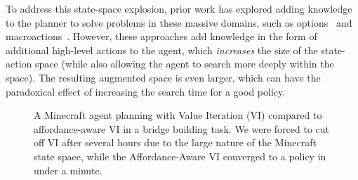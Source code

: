 \documentclass[]{article}
\begin{document}
To address this state-space explosion, prior work has explored adding
knowledge to the planner to solve problems in these
massive domains, such as options~\citep{sutton99} and
macroactions~\citep{Botea:2005kx,Newton:2005vn}. However, these
approaches add knowledge in the form of additional high-level actions
to the agent, which {\em increases} the size of the state-action space
(while also allowing the agent to search more deeply within the
space).  The resulting augmented space is even larger, which can have
the paradoxical effect of increasing the search time for a good
policy.

\begin{figure}
\centering
%
%
  \caption{A Minecraft agent planning with Value
    Iteration (VI) compared to affordance-aware VI in a bridge building task. We were forced to cut off VI after several hours due to the large nature of the Minecraft state space, while the Affordance-Aware VI converged to a policy in under a minute.}
    
\label{fig:minecraft}
\end{figure}
\end{document}
